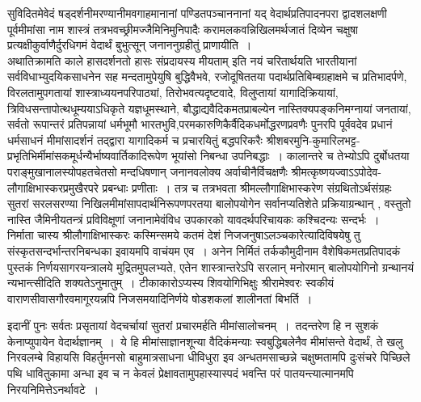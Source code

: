 \documentclass[11pt, openany]{book}
\begin{document}
सुविदितमेवेदं षड्दर्शनीमरण्यानीमवगाहमानानां पण्डितपञ्चाननानां यद् वेदार्थप्रतिपादनपरा  द्वादशलक्षणी पूर्वमीमांसा नाम शास्त्रं तत्रभवच्छ्रीमज्जैमिनिमुनिपादैः करामलकवन्निखिलमर्थजातं दिव्येन चक्षुषा प्रत्यक्षीकुर्वाणैर्दुरधिगमं वेदार्थं बुभुत्सून् जनाननुग्रहीतुं प्राणायीति~।\\

 अथातिक्रामति काले {\qt हासदर्शनतो हासः संप्रदायस्य मीयताम्} इति नयं चरितार्थयति भारतीयानां सर्वविधाभ्युदयिकसाधनेन सह मन्दतामुपेयुषि बुद्धिवैभवे, रजोदूषिततया पदार्थप्रतिबिम्बग्रहाक्षमे च प्रतिभादर्पणे, विरलतामुपगतायां शास्त्राध्ययनपरिपाठ्यां, तिरोभवत्यदृष्टवादे, विलुप्तायां यागादिक्रियायां, त्रिविधसन्तापोत्थधूम्ययाऽधिकृते यज्ञधूमस्थाने, बौद्धाद्यवैदिकमतप्राबल्येन नास्तिक्यपङ्कनिमग्नायां जनतायां, सर्वतो रूपान्तरं प्रतिपन्नायां धर्मभूमौ भारतभुवि,परमकारुणिकैर्वैदिकधर्मोद्धरणप्रवणैः पुनरपि पूर्ववदेव प्रधानं धर्मसाधनं मीमांसादर्शनं तद्द्वारा यागादिकर्म च प्रचारयितुं बद्धपरिकरैः श्रीशबरमुनि-कुमारिलभट्ट-प्रभृतिभिर्मीमांसकमूर्धन्यैर्भाष्यवार्तिकादिरूपेण भूयांसो निबन्धा उपनिबद्धाः~। कालान्तरे च तेभ्योऽपि दुर्बोधतया पराङ्मुखानालस्योपहतचेतसो मन्दधिषणान् जनानवलोक्य अर्वाचीनैर्विचक्षणैः श्रीमत्कृष्णयज्वाऽऽपोदेव- लौगाक्षिभास्करप्रमुखैरपरे प्रबन्धाः प्रणीताः~। तत्र च तत्रभवता श्रीमल्लौगाक्षिभास्करेण संग्रथितोऽर्थसंग्रहः सुतरां सरलसरण्या निखिलमीमांसापदार्थनिरूपणपरतया बालोपयोगेन सर्वानप्यतिशेते प्रक्रियाग्रन्थान् , वस्तुतो नास्ति जैमिनीयतन्त्रं प्रविविक्षूणां जनानामेवंविध उपकारको यावदर्थपरिचायकः कश्चिदन्यः सन्दर्भः~।\\

 निर्माता चास्य श्रीलौगाक्षिभास्करः कस्मिन्समये कतमं देशं निजजनुषाऽलञ्चकारेत्यादिविषयेषु तु संस्कृतसन्दर्भान्तरनिबन्धका इवायमपि वाचंयम एव~। अनेन निर्मितं तर्ककौमुदीनाम वैशेषिकमतप्रतिपादकं पुस्तकं निर्णयसागरयन्त्रालये मुद्रितमुपलभ्यते, एतेन शास्त्रान्तरेऽपि सरलान् मनोरमान् बालोपयोगिनो ग्रन्थानयं न्यभान्त्सीदिति शक्यतेऽनुमातुम्~। टीकाकारोऽप्यस्य शिवयोगिभिक्षुः श्रीरामेश्वरः स्वकीयं वाराणसीवासगौरवमागूरयन्नपि निजसमयादिनिर्णये षोडशकलां शालीनतां बिभर्ति~।
\newpage
\pagestyle{fancy}
\cfoot{}

{ इदानीं पुनः सर्वतः प्रसृतायां वेदचर्चायां सुतरां प्रचारमर्हति मीमांसालोचनम्~।~तदन्तरेण हि न सुशकं केनाप्युपायेन वेदार्थज्ञानम्~।~ये हि मीमांसाज्ञानशून्या वैदिकंमन्याः स्वबुद्धिबलेनैव मीमांसन्ते वेदार्थं, ते खलु निरवलम्बे विहायसि विहर्तुमनसो बाहुमात्रसाधना धीविधुरा इव अन्धतमसाच्छन्ने चक्षुष्मतामपि दुःसंचरे पिच्छिले पथि धावितुकामा अन्धा इव च न केवलं प्रेक्षावतामुपहास्यास्पदं भवन्ति परं पातयन्त्यात्मानमपि निरयनिमित्तेऽनर्थावटे~।}\\
\end{document}
